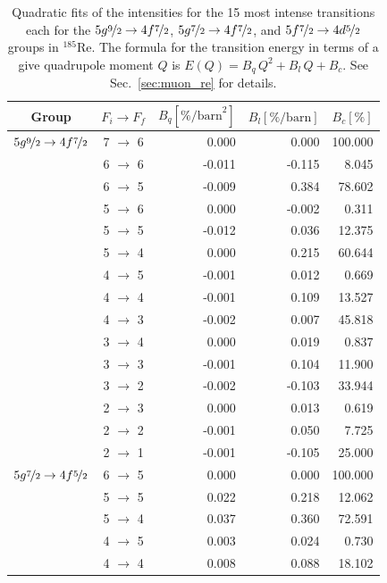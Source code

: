 \begin{table}[b]
\caption{\label{tab:re185intens}%
Quadratic fits of the intensities for the 15 most intense transitions each for the $5g\nicefrac{9}{2}\rightarrow4f\nicefrac{7}{2}$, $5g\nicefrac{7}{2}\rightarrow4f\nicefrac{7}{2}$, and $5f\nicefrac{7}{2}\rightarrow4d\nicefrac{5}{2}$ groups in $^{185}$Re. The formula for the transition energy in terms of a give quadrupole moment $Q$ is $E(Q)=B_q \, Q^2 + B_l \, Q + B_c$. See Sec.~\ref{sec:muon_re} for details.}
\centering
\begin{small}
\begin{tabular}{cc|rrr}
Group& $F_i \rightarrow F_f$ & $B_q [\%\text{/barn}^2]$ & $B_l [\%\text{/barn}]$ & $B_c [\%]$\\[1pt]\hline%
$5g\nicefrac{9}{2} \rightarrow 4f\nicefrac{7}{2}$ & 7 $\rightarrow$ 6&0.000&0.000&100.000\\
 & 6 $\rightarrow$ 6&-0.011&-0.115&8.045\\
 & 6 $\rightarrow$ 5&-0.009&0.384&78.602\\
 & 5 $\rightarrow$ 6&0.000&-0.002&0.311\\
 & 5 $\rightarrow$ 5&-0.012&0.036&12.375\\
 & 5 $\rightarrow$ 4&0.000&0.215&60.644\\
 & 4 $\rightarrow$ 5&-0.001&0.012&0.669\\
 & 4 $\rightarrow$ 4&-0.001&0.109&13.527\\
 & 4 $\rightarrow$ 3&-0.002&0.007&45.818\\
 & 3 $\rightarrow$ 4&0.000&0.019&0.837\\
 & 3 $\rightarrow$ 3&-0.001&0.104&11.900\\
 & 3 $\rightarrow$ 2&-0.002&-0.103&33.944\\
 & 2 $\rightarrow$ 3&0.000&0.013&0.619\\
 & 2 $\rightarrow$ 2&-0.001&0.050&7.725\\
 & 2 $\rightarrow$ 1&-0.001&-0.105&25.000\\[10pt]
$5g\nicefrac{7}{2} \rightarrow 4f\nicefrac{5}{2}$ & 6 $\rightarrow$ 5&0.000&0.000&100.000\\
 & 5 $\rightarrow$ 5&0.022&0.218&12.062\\
 & 5 $\rightarrow$ 4&0.037&0.360&72.591\\
 & 4 $\rightarrow$ 5&0.003&0.024&0.730\\
 & 4 $\rightarrow$ 4&0.008&0.088&18.102\\

\end{tabular}
\end{small}
\end{table}
